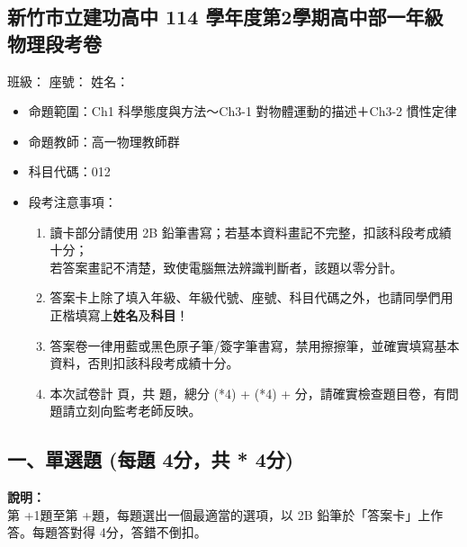 \documentclass[10pt,a4paper]{article}
\newcommand{\scscore}{4}
\newcommand{\mcscore}{4}
\newcommand{\examheader}{
    \begin{center}
        \section*{新竹市立建功高中 114 學年度第2學期高中部一年級物理段考卷}
    \end{center}
}
\begin{document}
\examheader

\noindent \hspace*{\fill} \large 班級：\underline{\hspace{1.5cm}} 座號：\underline{\hspace{1cm}} 姓名：\underline{\hspace{2.5cm}}

\vspace{1em}

\begin{itemize}[leftmargin=1em]
    \item[$\ast$] 命題範圍：Ch1 科學態度與方法～Ch3-1 對物體運動的描述＋Ch3-2 慣性定律
    \item[$\ast$] 命題教師：高一物理教師群
    \item[$\ast$] 科目代碼：012
    \item[$\ast$] 段考注意事項：
    \begin{enumerate}[label=\arabic*., leftmargin=2em]
        \item 讀卡部分請使用 2B 鉛筆書寫；若基本資料畫記不完整，扣該科段考成績十分；\\若答案畫記不清楚，致使電腦無法辨識判斷者，該題以零分計。
        \item 答案卡上除了填入年級、年級代號、座號、科目代碼之外，也請同學們用正楷填寫上\textbf{姓名}及\textbf{科目}！
        \item 答案卷一律用藍或黑色原子筆/簽字筆書寫，禁用擦擦筆，並確實填寫基本資料，否則扣該科段考成績十分。
        \item 本次試卷計 \pageref{EndOfExam} 頁，共  題，總分 \the\numexpr (*\scscore) + (*\mcscore) +  \relax 分，請確實檢查題目卷，有問題請立刻向監考老師反映。
    \end{enumerate}
\end{itemize}

\subsection*{一、單選題 (每題 \scscore 分，共 \the\numexpr {} * \scscore \relax 分)}
\begin{center}
    \begin{tcolorbox}[colframe=black, colback=white, halign=left, width=\textwidth, arc=2mm]
        \small \textbf{說明：} \\
        第 \the\numexpr\value{qcount}+1\relax 題至第 \the\numexpr\value{qcount}+\relax 題，每題選出一個最適當的選項，以 2B 鉛筆於「答案卡」上作答。每題答對得 \scscore 分，答錯不倒扣。 \\
    \end{tcolorbox}
\end{center}
\end{document}
